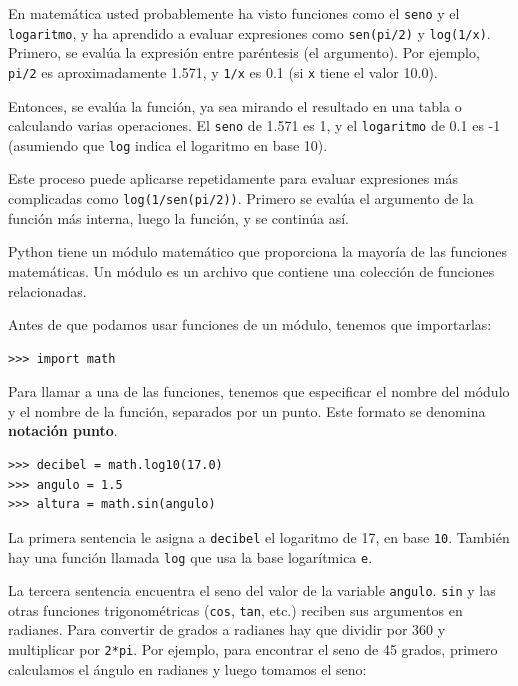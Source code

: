  

En matemática usted probablemente ha visto funciones como el \texttt{seno}
y el \texttt{logaritmo}, y ha aprendido a evaluar expresiones como
\texttt{sen(pi/2)} y \texttt{log(1/x)}. Primero, se evalúa la expresión
entre paréntesis (el argumento). Por ejemplo, \texttt{pi/2} es aproximadamente
1.571, y \texttt{1/x} es 0.1 (si \texttt{x} tiene el valor 10.0).

Entonces, se evalúa la función, ya sea mirando el resultado en una
tabla o calculando varias operaciones. El \texttt{seno} de 1.571 es
1, y el \texttt{logaritmo} de 0.1 es -1 (asumiendo que \texttt{log}
indica el logaritmo en base 10).

Este proceso puede aplicarse repetidamente para evaluar expresiones
más complicadas como \texttt{log(1/sen(pi/2))}. Primero se evalúa
el argumento de la función más interna, luego la función, y se continúa
así.

Python tiene un módulo matemático que proporciona la mayoría de las
funciones matemáticas. Un módulo es un archivo que contiene una colección
de funciones relacionadas.


Antes de que podamos usar funciones de un módulo, tenemos que importarlas:

\begin{verbatim}
>>> import math
\end{verbatim}
 Para llamar a una de las funciones, tenemos que especificar el nombre
del módulo y el nombre de la función, separados por un punto. Este
formato se denomina \textbf{notación punto}.


\begin{verbatim}
>>> decibel = math.log10(17.0)
>>> angulo = 1.5
>>> altura = math.sin(angulo)
\end{verbatim}
 La primera sentencia le asigna a \texttt{decibel} el logaritmo de
17, en base \texttt{10}. También hay una función llamada \texttt{log}
que usa la base logarítmica \texttt{e}.

La tercera sentencia encuentra el seno del valor de la variable \texttt{angulo}.
\texttt{sin} y las otras funciones trigonométricas (\texttt{cos},
\texttt{tan}, etc.) reciben sus argumentos en radianes. Para convertir
de grados a radianes hay que dividir por 360 y multiplicar por \texttt{2{*}pi}.
Por ejemplo, para encontrar el seno de 45 grados, primero calculamos
el ángulo en radianes y luego tomamos el seno:

